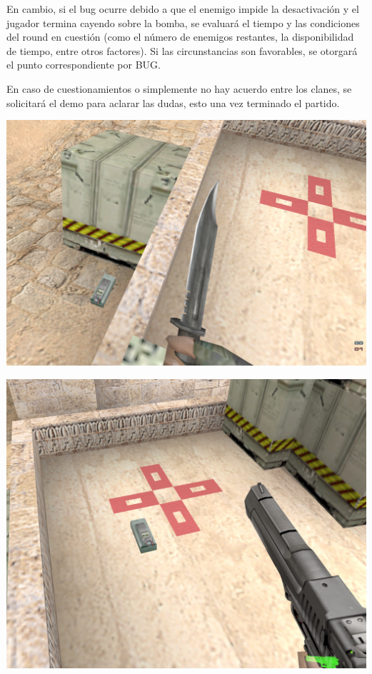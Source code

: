 \documentclass[a4paper, 11pt]{article}
\begin{document}
    En cambio, si el bug ocurre debido a que el enemigo impide la desactivación y el jugador termina cayendo sobre la bomba, se evaluará el tiempo y las condiciones del round en cuestión (como el número de enemigos restantes, la disponibilidad de tiempo, entre otros factores). Si las circunstancias son favorables, se otorgará el punto correspondiente por BUG.

    En caso de cuestionamientos o simplemente no hay acuerdo entre los clanes, se solicitará el demo para aclarar las dudas, esto una vez terminado el partido.
    
    \begin{minipage}{0.40\textwidth}
        \centering
        \includegraphics[width=\textwidth]{img/c4_bug.png}
    \end{minipage}
    \hspace{0.05\textwidth}
    \begin{minipage}{0.45\textwidth}
        \centering
        \includegraphics[width=\textwidth]{img/c4_nobug.png}
    \end{minipage}
\end{document}

